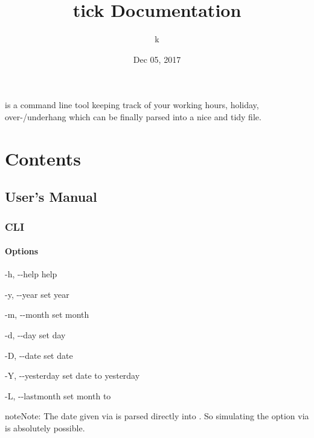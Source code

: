 \documentclass[letterpaper,10pt,english]{sphinxmanual}
\title{tick Documentation}
\date{Dec 05, 2017}
\author{k}
\begin{document}
\maketitle
\sphinxtableofcontents
{}\label{\detokenize{index::doc}}


 is a command line tool keeping track of your working hours, holiday, over-/underhang which can be finally parsed into a nice and tidy  file.


\chapter{Contents}
\label{\detokenize{index:time-clock}}\label{\detokenize{index:contents}}

\section{User’s Manual}
\label{\detokenize{usermanual::doc}}\label{\detokenize{usermanual:users-manual}}

\subsection{CLI}
\label{\detokenize{usermanual:cli}}

\subsubsection{Options}
\label{\detokenize{usermanual:options}}\begin{optionlist}{3cm}
\item [-h, -{-}help]  
help
\item [-y, -{-}year]  
set year
\item [-m, -{-}month]  
set month
\item [-d, -{-}day]  
set day
\item [-D, -{-}date]  
set date
\item [-Y, -{-}yesterday]  
set date to yesterday
\item [-L, -{-}lastmonth]  
set month to 
\end{optionlist}

\begin{sphinxadmonition}{note}{Note:}
The date given via  is parsed directly into . So simulating the option  via  is absolutely possible.
\end{sphinxadmonition}
\end{document}
